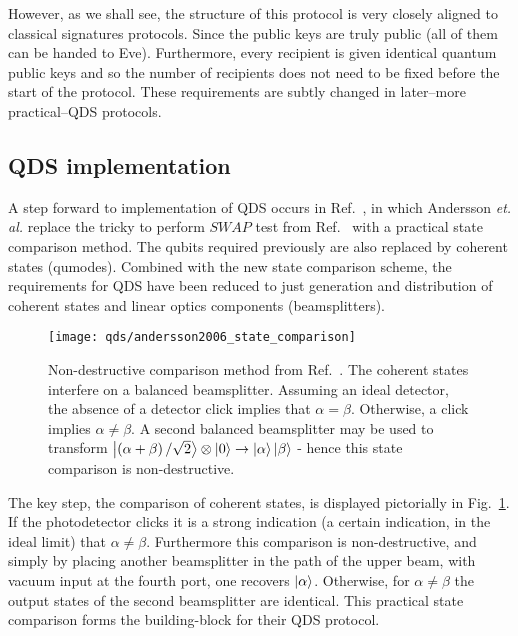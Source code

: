 However, as we shall see, the structure of this protocol is very closely aligned to classical signatures protocols. Since the public keys are truly public (all of them can be handed to Eve). Furthermore, every recipient is given identical quantum public keys and so the number of recipients does not need to be fixed before the start of the protocol. These requirements are subtly changed in later--more practical--QDS protocols. 


\subsection*{QDS implementation}
A step forward to implementation of QDS occurs in Ref.~\cite{Andersson2006}, in which Andersson \emph{et. al.} replace the tricky to perform $SWAP$ test from Ref.~\cite{Gottesman2001} with a practical state comparison method. The qubits required previously are also replaced by coherent states (qumodes). Combined with the new state comparison scheme, the requirements for QDS have been reduced to just generation and distribution of coherent states and linear optics components (beamsplitters).

\begin{figure}[htp]
\centering
\texttt{[image: qds/andersson2006\_state\_comparison]}
\caption{\label{fig:andersson2006_state_comparison} Non-destructive comparison method from Ref.~\cite{Andersson2006}. The coherent states interfere on a balanced beamsplitter. Assuming an ideal detector, the absence of a detector click implies that $\alpha = \beta$. Otherwise, a click implies $\alpha \ne \beta$. A second balanced beamsplitter may be used to transform $\ket{\left(\alpha+\beta\right)/\sqrt{2}}\otimes\ket{0}\rightarrow\ket{\alpha}\ket{\beta}$ - hence this state comparison is non-destructive.}
\end{figure}

The key step, the comparison of coherent states, is displayed pictorially in Fig.~\ref{fig:andersson2006_state_comparison}. If the photodetector clicks it is a strong indication (a certain indication, in the ideal limit) that $\alpha \ne \beta$. Furthermore this comparison is non-destructive, and simply by placing another beamsplitter in the path of the upper beam, with vacuum input at the fourth port, one recovers $\ket{\alpha}$. Otherwise, for $\alpha \ne \beta$ the output states of the second beamsplitter are identical. This practical state comparison forms the building-block for their QDS protocol. 

